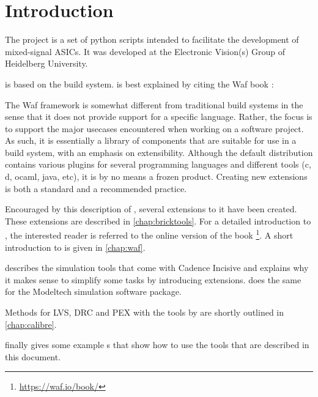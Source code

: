 \chapter{Introduction}

The  project is a set of python scripts intended to facilitate the
development of mixed-signal \Glspl{ASIC}. It was developed at the
Electronic Vision(s) Group of Heidelberg University.

 is based on the  build system.  is best explained by
citing the Waf book \citep{nagy2015waf}:
\begin{displayquote}
	The Waf framework is somewhat different from traditional build systems in
	the sense that it does not provide support for a specific language. Rather,
	the focus is to support the major usecases encountered when working on a
	software project. As such, it is essentially a library of components that
	are suitable for use in a build system, with an emphasis on extensibility.
	Although the default distribution contains various plugins for several
	programming languages and different tools (c, d, ocaml, java, etc), it is
	by no means a frozen product. Creating new extensions is both a standard
	and a recommended practice.
\end{displayquote}

Encouraged by this description of , several extensions to it have been
created. These extensions are described in \cref{chap:bricktools}.
For a detailed introduction to , the interested reader is referred to
the online version of the  book
\citep{nagy2015waf}\footnote{\url{https://waf.io/book/}}. A short introduction to
 is given in \cref{chap:waf}.

 describes the simulation tools that come with Cadence
Incisive and explains why it makes sense to simplify some tasks by introducing
 extensions.  does the same for the Modeltech
simulation software package.

Methods for \gls{LVS}, \gls{DRC} and \gls{PEX} with the  tools by
 are shortly outlined in \cref{chap:calibre}.

 finally gives some example s that show how to use the  tools that are described in this document.

